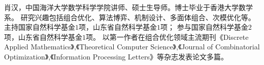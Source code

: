 %
%

\par{
\fontsize{9.65pt}{\baselineskip}\selectfont
肖汉，中国海洋大学数学科学学院讲师、硕士生导师。博士毕业于香港大学数学系。
研究兴趣包括组合优化、算法博弈、机制设计、多面体组合、次模优化等。
主持国家自然科学基金$1$项，山东省自然科学基金$1$项；
参与国家自然科学基金$2$项，山东省自然科学基金$1$项。
以第一作者在组合优化领域主流期刊《Discrete Applied Mathematics》,《Theoretical Computer Science》,《Journal of Combinatorial Optimization》,《Information Processing Letters》等杂志发表论文多篇。
}